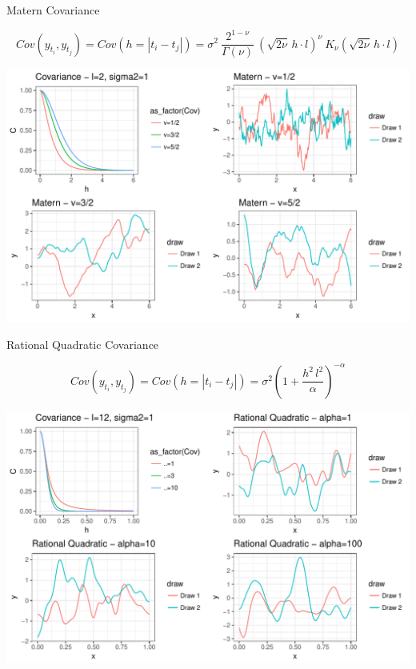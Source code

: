 \documentclass[11pt,ignorenonframetext,]{beamer}
\begin{document}
\begin{frame}[t]{Matern Covariance}

\vspace{-10mm}
\[ Cov(y_{t_i}, y_{t_j}) = Cov(h = |t_i - t_j|) = \sigma^2 ~ \frac{2^{1-\nu}}{\Gamma(\nu)} ~ \left(\sqrt{2\nu}\, h \cdot l\right)^\nu ~ K_\nu\left(\sqrt{2\nu} \, h \cdot l\right)\]

\begin{center}\includegraphics{Lec14_files/figure-beamer/unnamed-chunk-11-1} \end{center}

\end{frame}

\begin{frame}[t]{Rational Quadratic Covariance}

\vspace{-5mm}
\[ Cov(y_{t_i}, y_{t_j}) = Cov(h = |t_i - t_j|) = \sigma^2 \left(1 + \frac{h^2 \, l^2}{\alpha}\right)^{-\alpha}\]

\begin{center}\includegraphics{Lec14_files/figure-beamer/unnamed-chunk-12-1} \end{center}

\end{frame}
\end{document}

